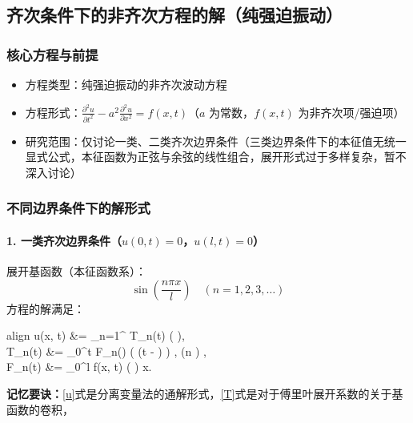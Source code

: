 \documentclass{article}
\begin{document}
	\subsection{齐次条件下的非齐次方程的解（纯强迫振动）}
	
	\subsubsection{核心方程与前提}
	\begin{itemize}
		\item 方程类型：纯强迫振动的非齐次波动方程
		\item 方程形式：$ \frac{\partial^2 u}{\partial t^2} - a^2 \frac{\partial^2 u}{\partial x^2} = f(x, t) $（$ a $ 为常数，$ f(x,t) $ 为非齐次项/强迫项）
		\item 研究范围：仅讨论一类、二类齐次边界条件（三类边界条件下的本征值无统一显式公式，本征函数为正弦与余弦的线性组合，展开形式过于多样复杂，暂不深入讨论）
	\end{itemize}
	\subsubsection{不同边界条件下的解形式}
	
	\paragraph{1. 一类齐次边界条件（$ u(0,t)=0 $，$ u(l,t)=0 $）}
	展开基函数（本征函数系）：
	\[
	\sin\left( \frac{n \pi x}{l} \right) \quad (n=1,2,3,\dots)
	\]
	方程的解满足：
	\begin{empheq}[left=\empheqlbrace]{align}
		u(x, t) &= \sum_{n=1}^{\infty} T_n(t) \cdot \sin\left(  \right), \label{u} \\
	T_n(t) &=  \int_{0}^{t} F_n(\tau) \cdot \sin\left(  (t - \tau) \right) \tau, \quad (n ) , \label{T} \\
		F_n(t) &=  \int_{0}^{l} f(x, t) \cdot \sin\left(  \right) x. \label{F}
	\end{empheq}
	
	\textbf{记忆要诀：}\ref{u}式是分离变量法的通解形式，\ref{T}式是对于傅里叶展开系数的关于基函数的卷积，
	
\end{document}
